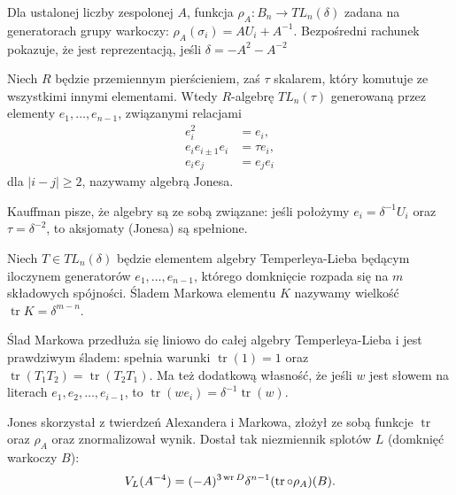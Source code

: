 Dla ustalonej liczby zespolonej $A$, funkcja $\rho_A \colon B_n \to TL_n(\delta)$ zadana na generatorach grupy warkoczy: $\rho_A(\sigma_i) = AU_i + A^{-1}$.
Bezpośredni rachunek pokazuje, że jest reprezentacją, jeśli $\delta = -A^2-A^{-2}$

\begin{definition}
%
    Niech $R$ będzie przemiennym pierścieniem, zaś $\tau$ skalarem, który komutuje ze wszystkimi innymi elementami.
    Wtedy $R$-algebrę $TL_n(\tau)$ generowaną przez elementy $e_1, \ldots, e_{n-1}$, związanymi relacjami
    \begin{align}
        e_i^2 & = e_i, \\
        e_i e_{i \pm 1} e_i & = \tau e_i, \\
        e_i e_j & = e_j e_i
    \end{align}
    dla $|i-j| \ge 2$, nazywamy algebrą Jonesa.
\end{definition}

Kauffman pisze, że algebry są ze sobą związane: jeśli położymy $e_i = \delta^{-1} U_i$ oraz $\tau = \delta^{-2}$, to aksjomaty (Jonesa) są spełnione.

\begin{definition}
%
    Niech $T \in TL_n(\delta)$ będzie elementem algebry Temperleya-Lieba będącym iloczynem generatorów $e_1, \ldots, e_{n-1}$, którego domknięcie rozpada się na $m$ składowych spójności.
    Śladem Markowa elementu $K$ nazywamy wielkość $\operatorname{tr} K = \delta^{m-n}$.
\end{definition}

Ślad Markowa przedłuża się liniowo do całej algebry Temperleya-Lieba i jest prawdziwym śladem: spełnia warunki $\operatorname{tr} (1) = 1$ oraz $\operatorname{tr} (T_1T_2) = \operatorname{tr} (T_2T_1)$.
Ma też dodatkową własność, że jeśli $w$ jest słowem na literach $e_1, e_2, \ldots, e_{i-1}$, to $\operatorname{tr}(we_i) = \delta^{-1} \operatorname{tr} (w)$.

Jones skorzystał z twierdzeń Alexandera i Markowa, złożył ze sobą funkcje $\operatorname{tr}$ oraz $\rho_A$ oraz znormalizował wynik.
Dostał tak niezmiennik splotów $L$ (domknięć warkoczy $B$):
\begin{equation}
    V_L(A^{-4}) = (-A)^{3 \operatorname{wr} D} \delta^{n-1} (\operatorname{tr} \circ \rho_A)(B).
\end{equation}


